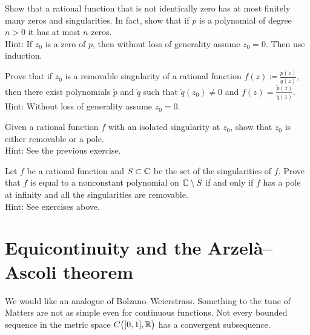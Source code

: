 \begin{exercise}
Show that a rational function that is not identically
zero has at most finitely many zeros and
singularities.  In fact, show that if $p$ is a polynomial of 
degree $n > 0$ it has at most $n$ zeros.
\\
Hint: If $z_0$ is a zero of $p$, then without loss of generality assume $z_0 =
0$.  Then use induction.
\end{exercise}

\begin{exercise}
Prove that if $z_0$ is a removable singularity of a rational
function $f(z) \coloneqq \frac{p(z)}{q(z)}$, then there exist
polynomials $\widetilde{p}$ and $\widetilde{q}$ such that
$\widetilde{q}(z_0) \neq 0$ and $f(z) =
\frac{\widetilde{p}(z)}{\widetilde{q}(z)}$.
\\
Hint: Without loss of generality assume $z_0 = 0$.
\end{exercise}

\begin{exercise}
Given a rational function $f$ with an isolated singularity at $z_0$,
show that $z_0$ is either removable or a pole.
\\
Hint: See the previous exercise.
\end{exercise}

\begin{exercise}
Let $f$ be a rational function and $S \subset {\mathbb{C}}$ be the 
set of the singularities of $f$.
Prove that $f$ is equal to a nonconstant polynomial on ${\mathbb{C}} \setminus S$
if and only if
$f$ has a pole at infinity and all the singularities are removable.
\\
Hint: See exercises above.
\end{exercise}




\sectionnewpage
\section{Equicontinuity and the Arzel\`a--Ascoli theorem}
\label{sec:arzelaascoli}


We would like an analogue of Bolzano--Weierstrass.  Something to the tune of
Matters are not
as simple even for continuous functions. 
Not every bounded sequence in the metric space $C\bigl([0,1],{\mathbb{R}}\bigr)$ has
a convergent subsequence.

